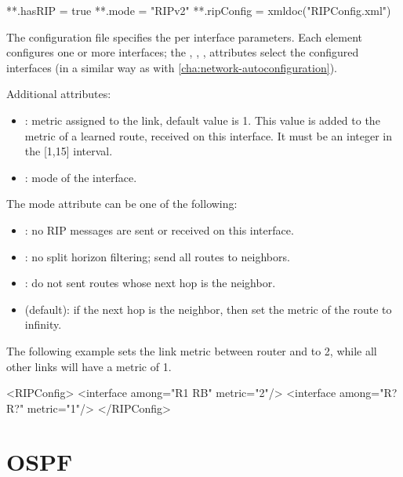 \begin{inifile}
**.hasRIP = true
**.mode = "RIPv2"
**.ripConfig = xmldoc("RIPConfig.xml")
\end{inifile}

The configuration file specifies the per interface parameters.
Each  element configures one or more interfaces;
the , , ,  attributes
select the configured interfaces (in a similar way as with
 \ref{cha:network-autoconfiguration}).

Additional attributes:

\begin{itemize}
  \item {}: metric assigned to the link, default value is 1.
        This value is added to the metric of a learned route,
        received on this interface. It must be an integer in
        the [1,15] interval.
  \item {}: mode of the interface.
\end{itemize}

The mode attribute can be one of the following:

\begin{itemize}
  \item {}: no RIP messages are sent or received on this interface.
  \item {}: no split horizon filtering; send all routes to
        neighbors.
  \item {}: do not sent routes whose next hop is the neighbor.
  \item {} (default): if the next hop is the neighbor, then
  set the metric of the route to infinity.
\end{itemize}

The following example sets the link metric between router
 and  to 2, while all other links will have a metric of 1.

\begin{XML}
<RIPConfig>
  <interface among="R1 RB" metric="2"/>
  <interface among="R? R?" metric="1"/>
</RIPConfig>
\end{XML}

\section{OSPF}
\label{sec:routing:ospf}

